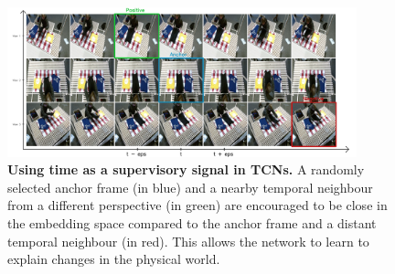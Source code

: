 \documentclass[\home/main.tex]{subfiles}
\begin{document}
\begin{figure}[htbp]
    \centering
    \includegraphics[width=0.90\textwidth, keepaspectratio]{figures/figs_tcn_sampling.jpg}
    \caption[Principle of using time as a supervisory signal.]{\textbf{Using time as a supervisory signal in TCNs.} A randomly selected anchor frame (in blue) and a nearby temporal neighbour from a different perspective (in green) are encouraged to be close in the embedding space compared to the anchor frame and a distant temporal neighbour (in red). This allows the network to learn to explain changes in the physical world.}
    \label{fig:rewards_triplet_mining}
\end{figure}
\end{document}
